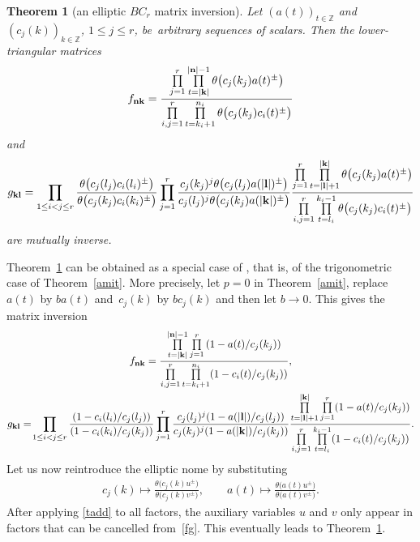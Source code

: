 \documentclass[pdftex]{sigma}%
\numberwithin{equation}{section}
\newtheorem{Theorem}{Theorem}[section]
\begin{document}
\begin{Theorem}[an elliptic $BC_r$ matrix inversion]\label{bcmit}
Let
$(a(t))_{t\in\mathbb Z}$ and $(c_j(k))_{k\in\mathbb
Z}$, $1 \leq j \leq r$,
 be~arbitrary sequences of scalars.
 Then the
lower-triangular matrices
\begin{gather*}
f_{\bf nk}=\frac{\prod\limits_{j=1}^r\prod\limits_{t=|{\bf k}|}^{|{\bf
n}|-1}\theta\big(c_j(k_j)a(t)^\pm\big)}
{\prod\limits_{i,j=1}^r\prod\limits_{t=k_i+1}^{n_i}\theta\big(c_j(k_j)c_i(t)^\pm\big)}
\end{gather*}
and
\begin{gather*}
g_{\bf kl}=\prod\limits_{1\leq i<j\leq r}
\frac{\theta\big(c_j(l_j)c_i(l_i)^\pm\big)}
{\theta\big(c_j(k_j)c_i(k_i)^\pm\big)}
\prod\limits_{j=1}^r\frac{c_j(k_j)^j\theta\big(c_j(l_j)a({|{\bf l}|})^\pm\big)}
{c_j(l_j)^j\theta\big(c_j(k_j)a({|{\bf k}|})^\pm\big)}
\frac{\prod\limits_{j=1}^r\prod\limits_{t=|{\bf l}|+1}^{|{\bf k}|}
\theta\big(c_j(k_j)a(t)^\pm\big)}
{\prod\limits_{i,j=1}^r\prod\limits_{t=l_i}^{k_i-1}\theta\big(c_j(k_j)c_i(t)^\pm\big)}
\end{gather*}
are mutually inverse.
\end{Theorem}

Theorem~\ref{bcmit} can be obtained as a special case of
 \cite[Theorem~3.1]{s}, that is, of the trigonometric case of
Theorem~\ref{amit}. More precisely, let $p=0$ in Theorem~\ref{amit}, replace $a(t)$
by $ba(t)$ and~$c_j(k)$ by $b c_j(k)$ and then let $b\rightarrow 0$.
This gives the matrix inversion
\begin{gather*}
f_{\bf nk}=\frac{\prod\limits_{t=|{\bf k}|}^{|{\bf n}|-1}\prod\limits_{j=1}^r\left(1-a(t)/c_j(k_j)\right)}
{\prod\limits_{i, j=1}^r\prod\limits_{t=k_i+1}^{n_i}(1-c_i(t)/c_j(k_j))},
\\
g_{\bf kl}=\!\prod\limits_{1\leq i<j\leq r}
\frac{(1-c_i(l_i)/c_j(l_j))}{(1-c_i(k_i)/c_j(k_j))}
\prod\limits_{j=1}^r\frac{c_j(l_j)^j(1-a({|{\bf l}|})/c_j(l_j))}
{c_j(k_j)^j(1-a({|{\bf k}|})/c_j(k_j))}
\frac{\prod\limits_{t=|{\bf l}|+1}^{|{\bf k}|}
\prod\limits_{j=1}^r(1-a(t)/c_j(k_j))}
{\prod\limits_{i,j=1}^r\prod\limits_{t=l_i}^{k_i-1}(1-c_i(t)/c_j(k_j))}.
\end{gather*}
Let us now reintroduce the elliptic nome by substituting
\begin{gather*}
c_j(k)\mapsto \frac{\theta\big(c_j(k)u^\pm\big)}{\theta\big(c_j(k)v^\pm\big)},\qquad a(t)\mapsto\frac{\theta\big(a(t)u^\pm\big)}{\theta\big(a(t)v^\pm\big)}.
\end{gather*}
After applying \eqref{tadd} to all factors, the auxiliary variables $u$ and $v$
only appear in factors that can be cancelled from~\eqref{fg}. This eventually leads to
Theorem~\ref{bcmit}.
\end{document}
